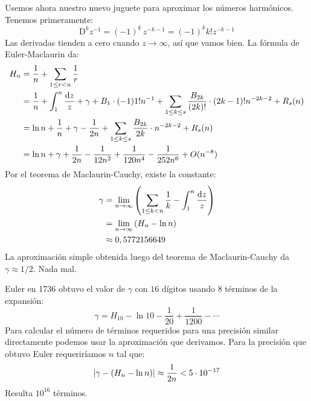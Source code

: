   Usemos ahora nuestro nuevo juguete
  para aproximar los números harmónicos.
  Tenemos primeramente:
  \begin{equation*}
    \mathrm{D}^k z^{-1}
       = (-1)^{\underline{k}} \, z^{- k - 1}
       = (-1)^k k! z^{- k - 1}
  \end{equation*}
  Las derivadas tienden a cero cuando \(z \rightarrow \infty\),
  así que vamos bien.
  La fórmula de Euler-Maclaurin da:%
  \begin{align}
    H_n
      &= \frac{1}{n} + \sum_{1 \le r < n} \frac{1}{r} \notag \\
      &= \frac{1}{n} + \int_1^n \frac{\mathrm{d} z}{z}
	   + \gamma
	   + B_1 \cdot (-1) 1! n^{-1}
	   + \sum_{1 \le k \le s}
	       \frac{B_{2 k}}{(2 k)!}
		  \cdot (2 k - 1)! n^{- 2 k - 2}
	   + R_s(n) \notag \\
      &= \ln n + \frac{1}{n}
	   + \gamma
	   - \frac{1}{2 n}
	   + \sum_{1 \le k \le s}
	       \frac{B_{2 k}}{2 k}
		  \cdot n^{- 2 k - 2}
	   + R_s(n)
	      \label{eq:Hn-asy-Bn} \\
      &= \ln n + \gamma + \frac{1}{2 n}
	   - \frac{1}{12 n^2}
	   + \frac{1}{120 n^4}
	   - \frac{1}{252 n^6}
	   + O(n^{-8})
	      \label{eq:Hn-asy-numbers}
  \end{align}
  Por el teorema de Maclaurin-Cauchy,%
  existe la constante:
  \begin{align*}
    \index{Euler, constante de|textbfhy}
    \index{\(\gamma\) (constante de Euler)|see{Euler, constante de}}
    \gamma
      &= \lim_{n \rightarrow \infty}
	   \left(
	     \sum_{1 \le k < n}
	       \frac{1}{k} - \int_1^n \frac{\mathrm{d} z}{z}
	   \right) \\
      &= \lim_{n \rightarrow \infty}
	   \left( H_n - \ln n \right) \\
      &\approx 0,5772156649
  \end{align*}
  La aproximación simple obtenida
  luego del teorema de Maclaurin-Cauchy
  da \(\gamma \approx 1 / 2\).
  Nada mal.

  Euler%
  en 1736 obtuvo el valor de \(\gamma\) con \(16\) dígitos
  usando \(8\) términos de la expansión:
  \begin{equation*}
    \gamma
      = H_{10} - \ln 10 - \frac{1}{20} + \frac{1}{1200} - \dotsb
  \end{equation*}
  Para calcular el número de términos requeridos
  para una precisión similar directamente
  podemos usar la aproximación que derivamos.
  Para la precisión que obtuvo Euler
  requeriríamos \(n\) tal que:
  \begin{equation*}
    \left\lvert \gamma - (H_n - \ln n) \right\rvert
      \approx \frac{1}{2 n}
      < 5 \cdot 10^{-17} \\
  \end{equation*}
  Resulta \(10^{16}\) términos.

